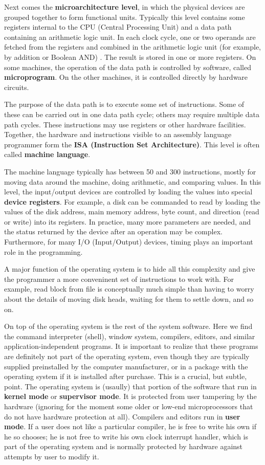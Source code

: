 \documentclass{book}
\newcommand {\kw}  [1] {\textbf{#1}}
\begin{document}
Next comes the \kw{microarchitecture level}, in which the physical devices are grouped together to form functional units.
Typically this level contains some registers internal to the CPU (Central Processing Unit) and a data path containing an arithmetic logic unit.
In each clock cycle, one or two operands are fetched from the registers and combined in the arithmetic logic unit 
(for example, by addition or Boolean AND) .
The result is stored in one or more registers.
On some machines, the operation of the data path is controlled by software, called \kw{microprogram}.
On the other machines, it is controlled directly by hardware circuits.

The purpose of the data path is to execute some set of instructions.
Some of these can be carried out in one data path cycle; others may require multiple data path cycles.
These instructions may use registers or other hardware facilities.
Together, the hardware and instructions visible to an assembly language programmer form the \kw{ISA (Instruction Set Architecture)}.
This level is often called \kw{machine language}.

The machine language typically has between 50 and 300 instructions, mostly for moving data around the machine, doing arithmetic, and comparing values.
In this level, the input/output devices are controlled by loading the values into special \kw{device registers}.
For example, a disk can be commanded to read by loading the values of the disk address, main memory address, byte count, 
and direction (read or write) into its registers.
In practice, many more parameters are needed, and the status returned by the device after an operation may be complex.
Furthermore, for many I/O (Input/Output) devices, timing plays an important role in the programming.

A major function of the operating system is to hide all this complexity and give the programmer a more conveninent set of instructions to work with.
For example, read block from file is conceptually much simple than having to worry about the details of moving disk heads, 
waiting for them to settle down, and so on.

On top of the operating system is the rest of the system software.
Here we find the command interpreter (shell), window system, compilers, editors, and similar application-independent programs.
It is important to realize that these programs are definitely not part of the operating system, 
even though they are typically supplied preinstalled by the computer manufacturer, 
or in a package with the operating system if it is installed after purchase.
This is a crucial, but subtle, point.
The operating system is (usaully) that portion of the software that run in \kw{kernel mode} or \kw{supervisor mode}.
It is protected from user tampering by the hardware 
(ignoring for the moment some older or low-end microprocessors that do not have hardware protection at all).
Compilers and editors run in \kw{user mode}.
If a user does not like a particular compiler, he is free to write his own if he so chooses; 
he is not free to write his own clock interrupt handler, which is part of the operating system 
and is normally protected by hardware against attempts by user to modify it.
\end{document}
